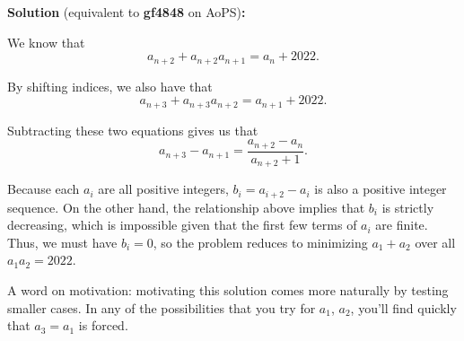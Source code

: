 
\begin{solution}
\textbf{Solution }(equivalent to \textbf{gf4848} on AoPS)\textbf{:}\V

We know that 
\[a_{n+2}+a_{n+2}a_{n+1} = a_n + 2022.\]

By shifting indices, we also have that
\[a_{n+3}+a_{n+3}a_{n+2} = a_{n+1} + 2022.\]

Subtracting these two equations gives us that 
\[a_{n+3} - a_{n+1} = \frac{a_{n+2}-a_n}{a_{n+2}+1}.\]

Because each $a_i$ are all positive integers, $b_i = a_{i+2} - a_i$ is also a positive integer sequence. On the other hand, the relationship above implies that $b_i$ is strictly decreasing, which is impossible given that the first few terms of $a_i$ are finite. Thus, we must have $b_i=0$, so the problem reduces to minimizing $a_1 + a_2$ over all $a_1a_2 = 2022$.\V

A word on motivation: motivating this solution comes more naturally by testing smaller cases. In any of the possibilities that you try for $a_1$, $a_2$, you'll find quickly that $a_3 = a_1$ is forced. 
\end{solution}\V